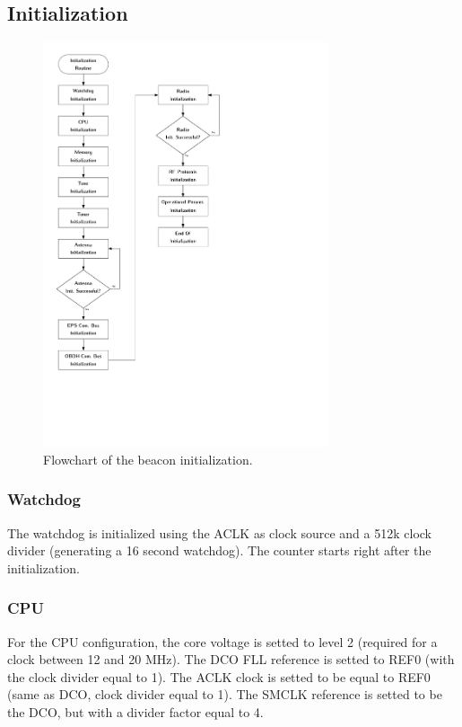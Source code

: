 \subsection{Initialization}

\begin{figure}[!h]
	\begin{center}
		\includegraphics[width=0.75\textwidth]{figures/beacon_init_flowchart.pdf}
		\caption{Flowchart of the beacon initialization.}
		\label{fig:beacon-init-flowchart}
	\end{center}
\end{figure}

\subsubsection{Watchdog}

The watchdog is initialized using the ACLK as clock source and a 512k clock divider (generating a 16 second watchdog). The counter starts right after the initialization.

\subsubsection{CPU}

For the CPU configuration, the core voltage is setted to level 2 (required for a clock between 12 and 20 MHz). The DCO FLL reference is setted to REF0 (with the clock divider equal to 1). The ACLK clock is setted to be equal to REF0 (same as DCO, clock divider equal to 1). The SMCLK reference is setted to be the DCO, but with a divider factor equal to 4.

